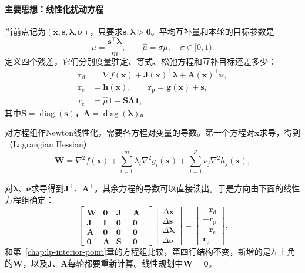 \paragraph{主要思想：线性化扰动方程}
当前点记为$(\bm{x},\bm{s},\bm{\lambda},\bm{\nu})$，只要求$\bm{s},\bm{\lambda}>\bm{0}$。平均互补量和本轮的目标参数是
\begin{equation}
 \mu=\frac{\bm{s}^\top\bm{\lambda}}{m},\qquad\hat{\mu}=\sigma\mu,\quad\sigma\in[0,1).
 \label{eq:nlipm-mu}
\end{equation}
定义四个残差，它们分别度量驻定、等式、松弛方程和互补目标还差多少：
\begin{equation}
 \begin{aligned}
 \bm{r}_{\mathrm{d}}&=\nabla f(\bm{x})+\bm{J}(\bm{x})^\top\bm{\lambda}+\bm{A}(\bm{x})^\top\bm{\nu},\\
 \bm{r}_{\mathrm{e}}&=\bm{h}(\bm{x}),\qquad
 \bm{r}_{\mathrm{p}}=\bm{g}(\bm{x})+\bm{s},\\
 \bm{r}_{\mathrm{c}}&=\hat{\mu}\bm{1}-\bm{S}\bm{\Lambda}\bm{1},
 \end{aligned}
 \label{eq:nlipm-residuals}
\end{equation}
其中$\bm{S}=\operatorname{diag}(\bm{s})$，$\bm{\Lambda}=\operatorname{diag}(\bm{\lambda})$。

对方程组作Newton线性化，需要各方程对变量的导数。第一个方程对$\bm{x}$求导，得到（Lagrangian Hessian）
\begin{equation}
 \bm{W}=\nabla^2f(\bm{x})+\sum_{i=1}^m\lambda_i\nabla^2g_i(\bm{x})+\sum_{j=1}^p\nu_j\nabla^2h_j(\bm{x}),
 \label{eq:nlipm-lagrange-hessian}
\end{equation}

对$\bm{\lambda}$、$\bm{\nu}$求导得到$\bm{J}^\top$、$\bm{A}^\top$。其余方程的导数可以直接读出。于是方向由下面的线性方程组确定：
\begin{equation}
 \begin{bmatrix}
 \bm{W}&\bm{0}&\bm{J}^\top&\bm{A}^\top\\
 \bm{J}&\bm{I}&\bm{0}&\bm{0}\\
 \bm{A}&\bm{0}&\bm{0}&\bm{0}\\
 \bm{0}&\bm{\Lambda}&\bm{S}&\bm{0}
 \end{bmatrix}
 \begin{bmatrix}\Delta\bm{x}\\\Delta\bm{s}\\\Delta\bm{\lambda}\\\Delta\bm{\nu}\end{bmatrix}
 =
 \begin{bmatrix}-\bm{r}_{\mathrm{d}}\\-\bm{r}_{\mathrm{p}}\\-\bm{r}_{\mathrm{e}}\\\bm{r}_{\mathrm{c}}\end{bmatrix}.
 \label{eq:nlipm-newton}
\end{equation}
和第~\ref{chap:lp-interior-point}章的方程组比较，第四行结构不变，新增的是左上角的$\bm{W}$，以及$\bm{J}$、$\bm{A}$每轮都要重新计算。线性规划中$\bm{W}=\bm{0}$。

